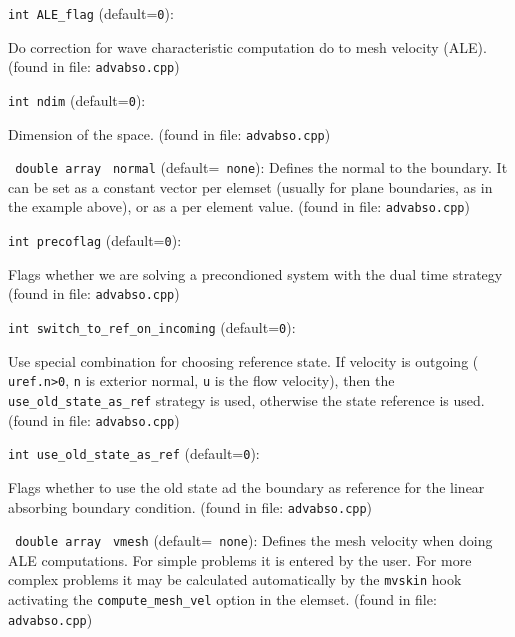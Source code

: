 \item\verb+int ALE_flag+ {\rm(default=\verb|0|)}:

Do correction for wave characteristic computation
 do to mesh velocity (ALE).
 (found in file: \verb+advabso.cpp+)
\item\verb+int ndim+ {\rm(default=\verb|0|)}:

Dimension of the space.
 (found in file: \verb+advabso.cpp+)
\item\verb+ double array+ \verb+ normal+ {\rm(default=\verb| none|)}:
 Defines the normal to the boundary. It
can be set as a constant vector per elemset (usually
for plane boundaries, as in the example above), or
as a per element   value. 
 (found in file: \verb+advabso.cpp+)
\item\verb+int precoflag+ {\rm(default=\verb|0|)}:

Flags whether we are solving a precondioned
system with the dual time strategy
 (found in file: \verb+advabso.cpp+)
\item\verb+int switch_to_ref_on_incoming+ {\rm(default=\verb|0|)}:

Use special combination for choosing reference state.
 If velocity is outgoing ( \verb+uref.n>0+, \verb+n+ is exterior
 normal, \verb+u+ is the flow velocity), then the
 \verb+use_old_state_as_ref+ strategy is used, otherwise the
 state reference is used. 
 (found in file: \verb+advabso.cpp+)
\item\verb+int use_old_state_as_ref+ {\rm(default=\verb|0|)}:

Flags whether to use the old state ad the
boundary as reference for the linear absorbing
boundary condition.
 (found in file: \verb+advabso.cpp+)
\item\verb+ double array+ \verb+ vmesh+ {\rm(default=\verb| none|)}:
 Defines the mesh velocity when doing ALE computations.
For simple problems it is entered by the user. For more
complex problems it may be calculated automatically
by the \verb+mvskin+ hook activating the \verb+compute_mesh_vel+
option in the elemset. 
 (found in file: \verb+advabso.cpp+)

